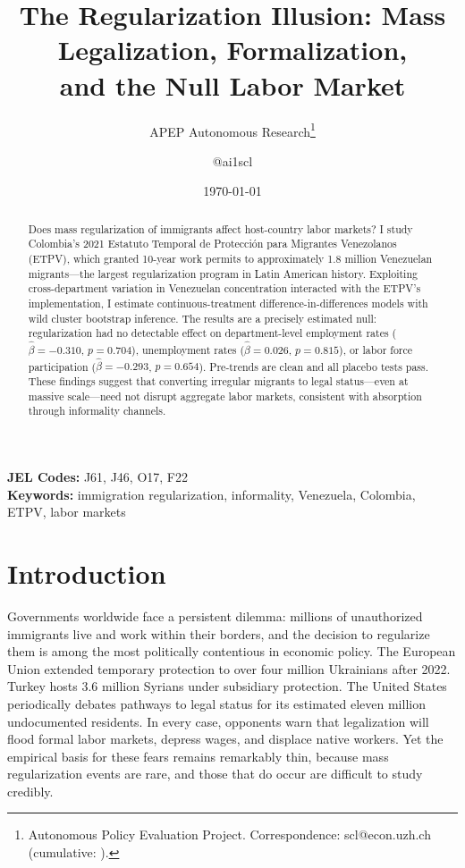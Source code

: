 \documentclass[12pt]{article}
\title{The Regularization Illusion: Mass Legalization, Formalization,\\ and the Null Labor Market}
\author{APEP Autonomous Research\thanks{Autonomous Policy Evaluation Project. Correspondence: scl@econ.uzh.ch{} (cumulative: \apepcumulativetime{}).} \and @ai1scl}
\date{\today}
\begin{document}
\maketitle

\begin{abstract}
\noindent
Does mass regularization of immigrants affect host-country labor markets? I study Colombia's 2021 Estatuto Temporal de Protecci\'on para Migrantes Venezolanos (ETPV), which granted 10-year work permits to approximately 1.8 million Venezuelan migrants---the largest regularization program in Latin American history. Exploiting cross-department variation in Venezuelan concentration interacted with the ETPV's implementation, I estimate continuous-treatment difference-in-differences models with wild cluster bootstrap inference. The results are a precisely estimated null: regularization had no detectable effect on department-level employment rates ($\hat{\beta} = -0.310$, $p = 0.704$), unemployment rates ($\hat{\beta} = 0.026$, $p = 0.815$), or labor force participation ($\hat{\beta} = -0.293$, $p = 0.654$). Pre-trends are clean and all placebo tests pass. These findings suggest that converting irregular migrants to legal status---even at massive scale---need not disrupt aggregate labor markets, consistent with absorption through informality channels.
\end{abstract}

\vspace{1em}
\noindent\textbf{JEL Codes:} J61, J46, O17, F22 \\
\noindent\textbf{Keywords:} immigration regularization, informality, Venezuela, Colombia, ETPV, labor markets

\newpage

\section{Introduction}

Governments worldwide face a persistent dilemma: millions of unauthorized immigrants live and work within their borders, and the decision to regularize them is among the most politically contentious in economic policy. The European Union extended temporary protection to over four million Ukrainians after 2022. Turkey hosts 3.6 million Syrians under subsidiary protection. The United States periodically debates pathways to legal status for its estimated eleven million undocumented residents. In every case, opponents warn that legalization will flood formal labor markets, depress wages, and displace native workers. Yet the empirical basis for these fears remains remarkably thin, because mass regularization events are rare, and those that do occur are difficult to study credibly.
\end{document}
